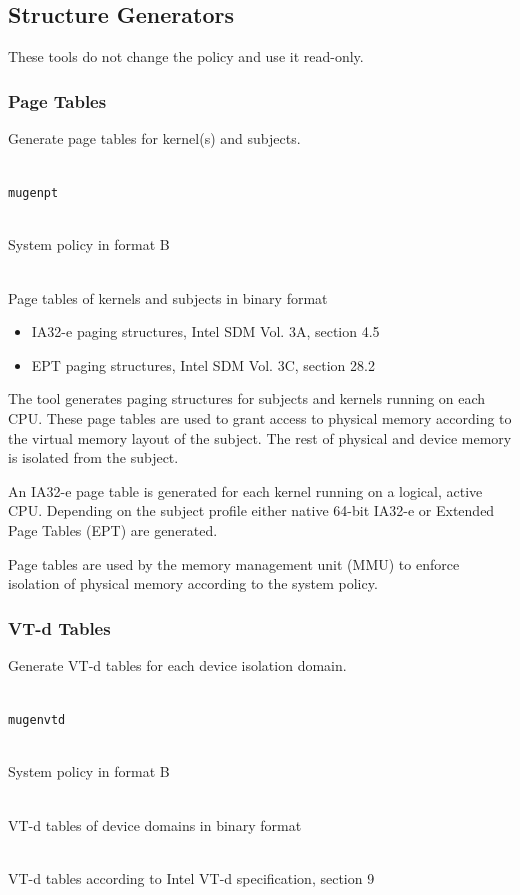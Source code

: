 \documentclass[a4paper,twoside,titlepage]{article}
\begin{document}
\subsection{Structure Generators}
\label{sec:tools-gen}
These tools do not change the policy and use it read-only.

\subsubsection{Page Tables}
Generate page tables for kernel(s) and subjects.

\begin{description} \itemsep1pt \parskip0pt
	\item[Name] \hfill \\
		\texttt{mugenpt}
	\item[Input] \hfill \\
		System policy in format B
	\item[Output] \hfill \\
		Page tables of kernels and subjects in binary format
	\item[Output format] \hfill
		\begin{itemize}
			\item IA32-e paging structures, Intel SDM Vol. 3A, section 4.5
			\item EPT paging structures, Intel SDM Vol. 3C, section 28.2
		\end{itemize}
\end{description}

The tool generates paging structures for subjects and kernels running on each
CPU. These page tables are used to grant access to physical memory according to
the virtual memory layout of the subject. The rest of physical and device
memory is isolated from the subject.

An IA32-e page table is generated for each kernel running on a logical, active
CPU. Depending on the subject profile either native 64-bit IA32-e or Extended
Page Tables (EPT) are generated.

Page tables are used by the memory management unit (MMU) to enforce isolation
of physical memory according to the system policy.

\subsubsection{VT-d Tables}
Generate VT-d tables for each device isolation domain.

\begin{description} \itemsep1pt \parskip0pt
	\item[Name] \hfill \\
		\texttt{mugenvtd}
	\item[Input] \hfill \\
		System policy in format B
	\item[Output] \hfill \\
		VT-d tables of device domains in binary format
	\item[Output format] \hfill \\
		VT-d tables according to Intel VT-d specification, section 9
\end{description}
\end{document}
